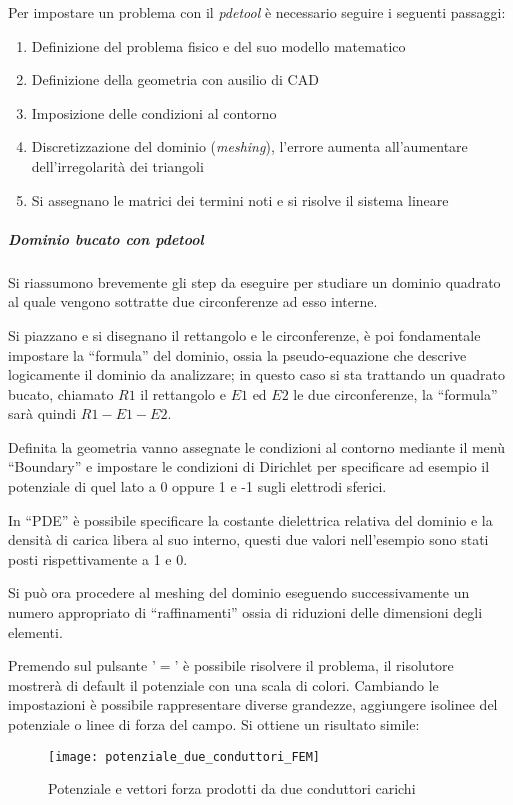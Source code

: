 Per impostare un problema con il \textit{pdetool} è necessario
seguire i seguenti passaggi:
\begin{enumerate}
\item Definizione del problema fisico e del suo modello matematico
\item Definizione della geometria con ausilio di CAD
\item Imposizione delle condizioni al contorno
\item Discretizzazione del dominio (\textit{meshing}), l'errore aumenta
all'aumentare dell'irregolarità dei triangoli
\item Si assegnano le matrici dei termini noti e si risolve il sistema lineare
\end{enumerate}

\subparagraph{Dominio bucato con pdetool}
Si riassumono brevemente gli step da eseguire per studiare un dominio quadrato
al quale vengono sottratte due circonferenze ad esso interne.

Si piazzano e si disegnano il rettangolo e le circonferenze, è poi
fondamentale impostare la ``formula'' del dominio, ossia la pseudo-equazione
che descrive logicamente il dominio da analizzare; in questo caso si sta
trattando un quadrato bucato, chiamato $R1$ il rettangolo e $E1$ ed $E2$ 
le due circonferenze, la ``formula'' sarà quindi $R1-E1-E2$.

Definita la geometria vanno assegnate le condizioni al contorno mediante il menù ``Boundary'' e impostare le condizioni di Dirichlet per specificare
ad esempio il potenziale di quel lato a 0 oppure 1 e -1 sugli elettrodi
sferici.

In ``PDE'' è possibile specificare la costante dielettrica relativa del
dominio e la densità di carica libera al suo interno, questi due valori
nell'esempio sono stati posti rispettivamente a 1 e 0.

Si può ora procedere al meshing del dominio eseguendo successivamente
un numero appropriato di ``raffinamenti'' ossia di riduzioni delle
dimensioni degli elementi.

Premendo sul pulsante '$=$' è possibile risolvere il problema, il risolutore
mostrerà di default il potenziale con una scala di colori. Cambiando le 
impostazioni è possibile rappresentare diverse grandezze, aggiungere 
isolinee del potenziale o linee di forza del campo.
\newpage
Si ottiene un risultato simile:
\begin{figure}[H]
\centering
\texttt{[image: potenziale\_due\_conduttori\_FEM]}
\caption{Potenziale e vettori forza prodotti da due conduttori carichi}
\end{figure}

